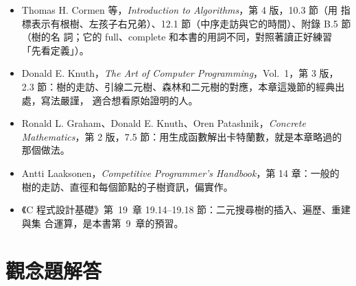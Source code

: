 \begin{itemize}
\item Thomas H. Cormen 等，\textit{Introduction to Algorithms}，第 4 版，10.3 節（用
指標表示有根樹、左孩子右兄弟）、12.1 節（中序走訪與它的時間）、附錄 B.5 節（樹的名
詞；它的 full、complete 和本書的用詞不同，對照著讀正好練習「先看定義」）。
\item Donald E. Knuth，\textit{The Art of Computer Programming}，Vol.~1，第 3 版，
2.3 節：樹的走訪、引線二元樹、森林和二元樹的對應，本章這幾節的經典出處，寫法嚴謹，
適合想看原始證明的人。
\item Ronald L. Graham、Donald E. Knuth、Oren Patashnik，\textit{Concrete
Mathematics}，第 2 版，7.5 節：用生成函數解出卡特蘭數，就是本章略過的那個做法。
\item Antti Laaksonen，\textit{Competitive Programmer's Handbook}，第 14 章：一般的
樹的走訪、直徑和每個節點的子樹資訊，偏實作。
\item 《C 程式設計基礎》第~19~章 19.14--19.18 節：二元搜尋樹的插入、遍歷、重建與集
合運算，是本書第~9~章的預習。
\end{itemize}

\section*{觀念題解答}

